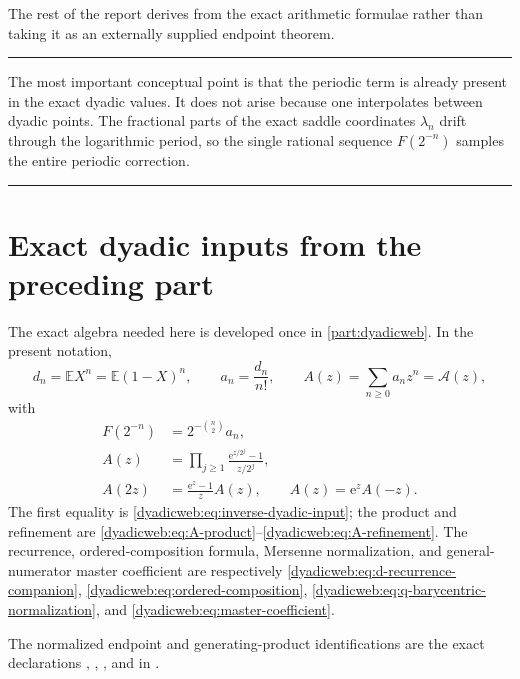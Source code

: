 \documentclass[11pt,oneside]{article}
\theoremstyle{definition}
\theoremstyle{remark}
\newcommand{\e}{\mathrm e}
\newcommand{\E}{\mathbb E}
\newenvironment{boxedremark}{%
  \par\smallskip\noindent\begin{center}\begin{minipage}{0.94\textwidth}%
  \color{black}\hrule\vspace{0.6em}\small
}{%
  \vspace{0.6em}\hrule\end{minipage}\end{center}\smallskip
}
\begin{document}
The rest of the report derives  from the exact arithmetic formulae rather
than taking it as an externally supplied endpoint theorem.

\begin{boxedremark}
The most important conceptual point is that the periodic term is already present in the exact
dyadic values.  It does not arise because one interpolates between dyadic points.  The
fractional parts of the exact saddle coordinates $\lambda_n$ drift through the logarithmic
period, so the single rational sequence $F(2^{-n})$ samples the entire periodic correction.
\end{boxedremark}

\section{Exact dyadic inputs from the preceding part}
\label{dyadicasym:sec:exact-inputs}

The exact algebra needed here is developed once in
\cref{part:dyadicweb}.  In the present notation,
\begin{equation}
 d_n=\E X^n=\E(1-X)^n,\qquad
 a_n=\frac{d_n}{n!},\qquad
 A(z)=\sum_{n\ge0}a_nz^n=\mathscr A(z),                  \label{dyadicasym:eq:an-A}
\end{equation}
with
\begin{align}
 F(2^{-n})&=2^{-\binom n2}a_n,                             \label{dyadicasym:eq:F-an}\\
 A(z)&=\prod_{j\ge1}\frac{\e^{z/2^j}-1}{z/2^j},          \label{dyadicasym:eq:A-product}\\
 A(2z)&=\frac{\e^z-1}{z}A(z),\qquad A(z)=\e^zA(-z).     \label{dyadicasym:eq:A-reflection}
\end{align}
The first equality is \eqref{dyadicweb:eq:inverse-dyadic-input}; the product and
refinement are \eqref{dyadicweb:eq:A-product}--\eqref{dyadicweb:eq:A-refinement}.
The recurrence, ordered-composition formula, Mersenne normalization, and general-numerator
master coefficient are respectively
\eqref{dyadicweb:eq:d-recurrence-companion},
\eqref{dyadicweb:eq:ordered-composition},
\eqref{dyadicweb:eq:q-barycentric-normalization}, and
\eqref{dyadicweb:eq:master-coefficient}.

The normalized endpoint and generating-product identifications are the exact declarations
,
,
, and
 in
.
\end{document}
